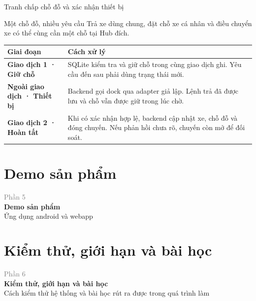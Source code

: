 \documentclass[aspectratio=169]{beamer}
\newcommand{\ChapterDivider}[3]{%
  \begin{frame}[plain]
    \centering\vspace{1.4cm}
    {\Large\textcolor{gray}{#1}}\\[0.25cm]
    {\Huge\textbf{\textcolor{BKTemplate}{#2}}}\\[0.5cm]
    {\normalsize #3}
  \end{frame}}
\begin{document}
\begin{frame}{Tranh chấp chỗ đỗ và xác nhận thiết bị}
  \begin{block}{Một chỗ đỗ, nhiều yêu cầu}
    Trả xe dùng chung, đặt chỗ xe cá nhân và điều chuyển xe có thể cùng cần một chỗ tại Hub đích.
  \end{block}
  \vspace{0.12cm}
  \centering
  \setlength{\tabcolsep}{5pt}
  {\small
    \begin{tabular}{@{}L{3.55cm}L{10.15cm}@{}}
      \toprule
      \textbf{Giai đoạn}                  & \textbf{Cách xử lý}                                                            \\
      \midrule
      \textbf{Giao dịch 1 · Giữ chỗ}      &
      SQLite kiểm tra và giữ chỗ trong cùng giao dịch ghi. Yêu cầu đến sau phải dùng trạng thái mới.                       \\
      \addlinespace[3pt]
      \textbf{Ngoài giao dịch · Thiết bị} &
      Backend gọi dock qua adapter giả lập. Lệnh trả đã được lưu và chỗ vẫn được giữ trong lúc chờ.                        \\
      \addlinespace[3pt]
      \textbf{Giao dịch 2 · Hoàn tất}     &
      Khi có xác nhận hợp lệ, backend cập nhật xe, chỗ đỗ và đóng chuyến. Nếu phản hồi chưa rõ, chuyến còn mở để đối soát. \\
      \bottomrule
    \end{tabular}
  }
  \vspace{0.12cm}
\end{frame}

\section{Demo sản phẩm}
\ChapterDivider{Phần 5}{Demo sản phẩm}{Ứng dụng android và webapp}


\section{Kiểm thử, giới hạn và bài học}
\ChapterDivider{Phần 6}{Kiểm thử, giới hạn và bài học}{Cách kiểm thử hệ thống và bài học rút ra được trong quá trình làm}
\end{document}
